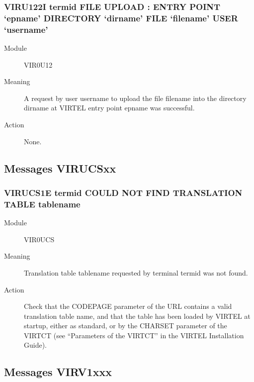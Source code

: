 \documentclass[letterpaper,10pt,english]{sphinxmanual}
\begin{document}
\subsubsection{VIRU122I termid FILE UPLOAD : ENTRY POINT ‘epname’ DIRECTORY ‘dirname’ FILE ‘filename’ USER ‘username’}
\label{\detokenize{messages:viru122i-termid-file-upload-entry-point-epname-directory-dirname-file-filename-user-username}}\begin{description}
\item[{Module}] \leavevmode
VIR0U12

\item[{Meaning}] \leavevmode
A request by user username to upload the file filename into the directory dirname at VIRTEL entry point epname was successful.

\item[{Action}] \leavevmode
None.

\end{description}


\subsection{Messages VIRUCSxx}
\label{\detokenize{messages:messages-virucsxx}}

\subsubsection{VIRUCS1E termid COULD NOT FIND TRANSLATION TABLE tablename}
\label{\detokenize{messages:virucs1e-termid-could-not-find-translation-table-tablename}}\begin{description}
\item[{Module}] \leavevmode
VIR0UCS

\item[{Meaning}] \leavevmode
Translation table tablename requested by terminal termid was not found.

\item[{Action}] \leavevmode
Check that the CODEPAGE parameter of the URL contains a valid translation table name, and that the table has been loaded by VIRTEL at startup, either as standard, or by the CHARSET parameter of the VIRTCT (see “Parameters of the VIRTCT” in the VIRTEL Installation Guide).

\end{description}


\subsection{Messages VIRV1xxx}
\label{\detokenize{messages:messages-virv1xxx}}
\end{document}
